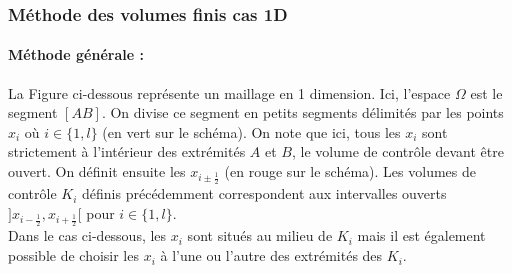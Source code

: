 \documentclass[12pt]{article}
\begin{document}
\subsubsection{Méthode des volumes finis cas 1D }
\paragraph{Méthode générale :}
La Figure ci-dessous représente un maillage en 1 dimension. Ici, l'espace $\Omega$ est le segment $[AB]$. On divise ce segment en petits segments délimités par les points $x_i$ où $i\in \{1,l\}$ (en vert sur le schéma). On note que ici, tous les $x_i$ sont strictement à l'intérieur des extrémités $A$ et $B$, le volume de contrôle devant être ouvert. On définit ensuite les $x_{i\pm\frac{1}{2}}$ (en rouge sur le schéma). Les volumes de contrôle $K_i$ définis précédemment correspondent aux intervalles ouverts $]x_{i-\frac{1}{2}},x_{i+\frac{1}{2}}[$ pour $i\in \{1,l\}$.
\\Dans le cas ci-dessous, les $x_i$ sont situés au milieu de $K_i$ mais il est également possible de choisir les $x_i$ à l'une ou l'autre des extrémités des $K_i$. 
\end{document}
